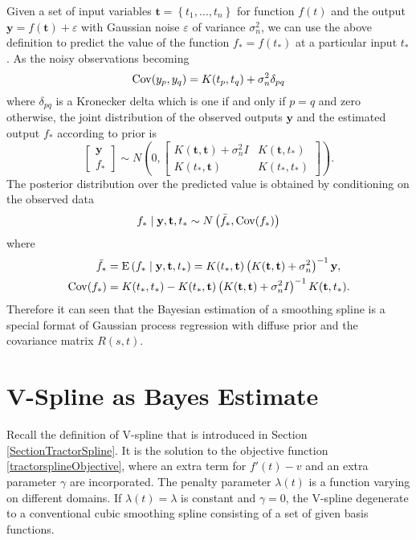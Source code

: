 Given a set of input variables $\mathbf{t} = \left\lbrace t_1,\ldots,t_n\right\rbrace$ for function $f(t)$ and the output $\mathbf{y}=f(\mathbf{t})+\varepsilon$ with \iid  Gaussian noise $\varepsilon$ of variance $\sigma_n^2$,  we can use the above definition to predict the value of the function $f_*=f(t_*)$ at a particular input $t_*$. As the noisy observations becoming
\begin{equation} \label{GaussianProcessCovDef}
\mathrm{Cov} (y_p,y_q) = K(t_p,t_q)+\sigma_n^2 \delta_{pq}
\end{equation}
where $\delta_{pq}$ is a Kronecker delta which is one if and only if $p=q$ and zero otherwise, the joint distribution of the observed outputs $\mathbf{y}$ and the estimated output $f_*$ according to prior is
\begin{equation}
\begin{bmatrix}
\mathbf{y}\\
f_*
\end{bmatrix} \sim N \left(  
0,  \begin{bmatrix}
K(\mathbf{t},\mathbf{t}) +\sigma_n^2I& K(\mathbf{t},t_*) \\
K(t_*,\mathbf{t}) & K(t_*,t_*)
\end{bmatrix} 
\right).
\end{equation}
The posterior distribution over the predicted value is obtained by conditioning on the observed data
\begin{equation}
f_* \mid  \mathbf{y},\mathbf{t},t_* \sim N\left(\bar{f_*},\mathrm{Cov} (f_*)\right)
\end{equation}
where 
\begin{align}
\bar{f_*}&=\mathrm{E} \left( f_* \mid  \mathbf{y},\mathbf{t},t_*\right) = K(t_*,\mathbf{t})\left( K(\mathbf{t},\mathbf{t})+\sigma_n^2\right) ^{-1}\mathbf{y},\\
\mathrm{Cov}(f_*)&=K(t_*,t_*)-K(t_*,\mathbf{t})\left( K(\mathbf{t},\mathbf{t})+\sigma_n^2I\right) ^{-1}K(\mathbf{t},t_*).
\end{align}
Therefore it can seen that the Bayesian estimation of a smoothing spline is a special format of Gaussian process regression with diffuse prior and the covariance matrix $R(s,t)$. 





\section{V-Spline as Bayes Estimate}


Recall the definition of V-spline that is introduced in Section \ref{SectionTractorSpline}. It is the solution to the objective function \eqref{tractorsplineObjective}, where an extra term for $f'(t)-v$ and an extra parameter $\gamma$ are incorporated. The penalty parameter $\lambda(t)$ is a function varying on different domains. If $\lambda(t)=\lambda$ is constant and $\gamma=0$, the V-spline degenerate to a conventional cubic smoothing spline consisting of a set of given basis functions.  

